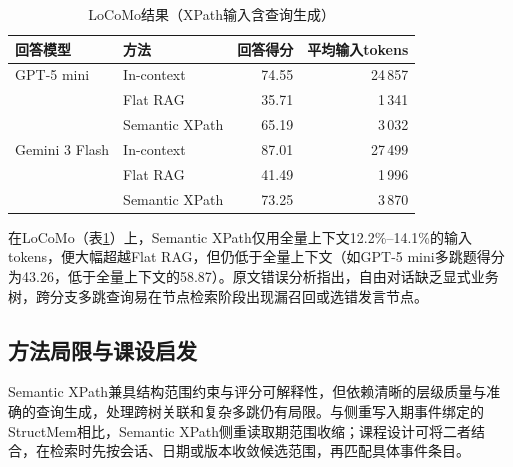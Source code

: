\begin{table}[H]
\centering
\caption{LoCoMo结果（XPath输入含查询生成）}
\label{tab:sxpath-locomo}
\begin{tabular}{@{}llrr@{}}
\toprule
回答模型 & 方法 & 回答得分 & 平均输入tokens \\
\midrule
GPT-5 mini & In-context & 74.55 & 24\,857 \\
 & Flat RAG & 35.71 & 1\,341 \\
 & Semantic XPath & 65.19 & 3\,032 \\
\midrule
Gemini 3 Flash & In-context & 87.01 & 27\,499 \\
 & Flat RAG & 41.49 & 1\,996 \\
 & Semantic XPath & 73.25 & 3\,870 \\
\bottomrule
\end{tabular}
\end{table}

在LoCoMo（表\ref{tab:sxpath-locomo}）上，Semantic XPath仅用全量上下文12.2\%--14.1\%的输入tokens，便大幅超越Flat RAG，但仍低于全量上下文（如GPT-5 mini多跳题得分为43.26，低于全量上下文的58.87）。原文错误分析指出，自由对话缺乏显式业务树，跨分支多跳查询易在节点检索阶段出现漏召回或选错发言节点。

\subsection{方法局限与课设启发}

Semantic XPath兼具结构范围约束与评分可解释性，但依赖清晰的层级质量与准确的查询生成，处理跨树关联和复杂多跳仍有局限。与侧重写入期事件绑定的StructMem相比，Semantic XPath侧重读取期范围收缩；课程设计可将二者结合，在检索时先按会话、日期或版本收敛候选范围，再匹配具体事件条目。

